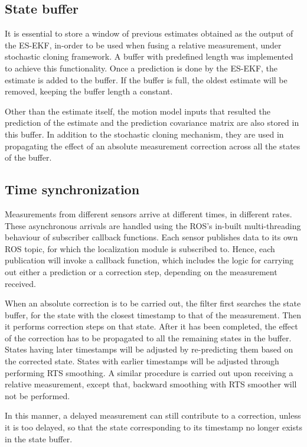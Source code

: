 \subsection{State buffer}
It is essential to store a window of previous estimates obtained as the output of the \gls{ES-EKF}, in-order to be used when fusing a relative measurement, under stochastic cloning framework. A buffer with predefined length was implemented to achieve this functionality. Once a prediction is done by the \gls{ES-EKF}, the estimate is added to the buffer. If the buffer is full, the oldest estimate will be removed, keeping the buffer length a constant.

Other than the estimate itself, the motion model inputs that resulted the prediction of the estimate and the prediction covariance matrix are also stored in this buffer. In addition to the stochastic cloning mechanism, they are used in propagating the effect of an absolute measurement correction across all the states of the buffer.

\subsection{Time synchronization}
Measurements from different sensors arrive at different times, in different rates. These asynchronous arrivals are handled using the \gls{ROS}'s in-built multi-threading behaviour of subscriber callback functions. Each sensor publishes data to its own \gls{ROS} topic, for which the localization module is subscribed to. Hence, each publication will invoke a callback function, which includes the logic for carrying out either a prediction or a correction step, depending on the measurement received.

When an absolute correction is to be carried out, the filter first searches the state buffer, for the state with the closest timestamp to that of the measurement. Then it performs correction steps on that state. After it has been completed, the effect of the correction has to be propagated to all the remaining states in the buffer. States having later timestamps will be adjusted by re-predicting them based on the corrected state. States with earlier timestamps will be adjusted through performing \gls{RTS} smoothing. A similar procedure is carried out upon receiving a relative measurement, except that, backward smoothing with \gls{RTS} smoother will not be performed.

In this manner, a delayed measurement can still contribute to a correction, unless it is too delayed, so that the state corresponding to its timestamp no longer exists in the state buffer.

